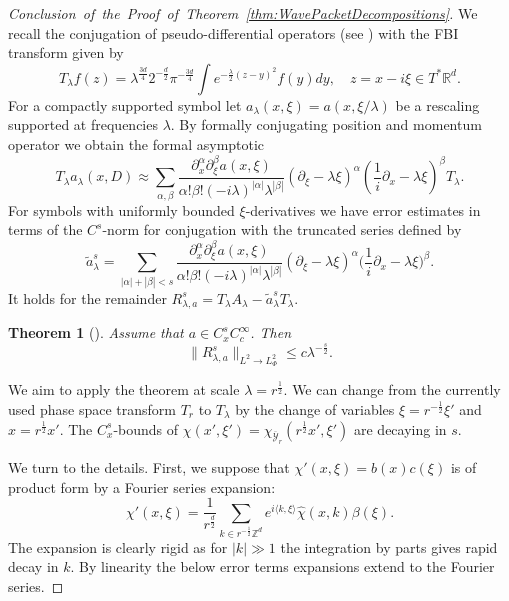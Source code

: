 \documentclass{amsart}
\newtheorem{theorem}{Theorem}[section]
\theoremstyle{definition}
\newcommand{\R}{\mathbb{R}}
\newcommand{\Z}{\mathbb{Z}}
\begin{document}
\begin{proof}[Conclusion~of~the~Proof~of~Theorem~\ref{thm:WavePacketDecompositions}]
\smallskip

    We recall the conjugation of pseudo-differential operators (see \cite[p.~351]{Tataru2000}) with the FBI transform given by
    \begin{equation*}
        T_\lambda f(z) = \lambda^{\frac{3d}{4}} 2^{-\frac{d}{2}} \pi^{-\frac{3d}{4}} \int e^{- \frac{\lambda}{2} (z-y)^2} f(y) dy, \quad z = x-i\xi \in T^* \R^d.
    \end{equation*}
    For a compactly supported symbol let $a_\lambda(x,\xi) = a(x,\xi/\lambda)$ be a rescaling supported at frequencies $\lambda$. By formally conjugating position and momentum operator we obtain the formal asymptotic
    \begin{equation*}
        T_\lambda a_\lambda(x,D) \approx \sum_{\alpha,\beta}  \frac{\partial_x^{\alpha} \partial_{\xi}^{\beta} a(x,\xi)}{\alpha! \beta! (-i \lambda)^{|\alpha|} \lambda^{|\beta|}} (\partial_{\xi} - \lambda \xi)^{\alpha} ( \frac{1}{i} \partial_x - \lambda \xi)^{\beta} T_\lambda.
    \end{equation*}
    For symbols with uniformly bounded $\xi$-derivatives we have error estimates in terms of the $C^s$-norm for conjugation with the truncated series defined by
    \begin{equation*}
        \tilde{a}^s_\lambda = \sum_{|\alpha|+|\beta|<s}  \frac{\partial_x^{\alpha} \partial_{\xi}^{\beta} a(x,\xi)}{\alpha! \beta! (-i \lambda)^{|\alpha|} \lambda^{|\beta|}} (\partial_{\xi} - \lambda \xi)^{\alpha} \big( \frac{1}{i} \partial_x - \lambda \xi \big)^{\beta}.
    \end{equation*}
    It holds for the remainder $R^s_{\lambda,a} = T_\lambda A_\lambda - \tilde{a}^s_\lambda T_\lambda$.
    \begin{theorem}[{\cite[Theorem~1]{Tataru2001}}]
    \label{thm:SymbolConjugation}
        Assume that $a \in C^s_x C^\infty_c$. Then
        \begin{equation*}
            \| R^s_{\lambda,a} \|_{L^2 \to L^2_{\Phi}} \leq c \lambda^{-\frac{s}{2}}.
        \end{equation*}
    \end{theorem}
    We aim to apply the theorem at scale $\lambda = r^{\frac{1}{2}}$. We can change from the currently used phase space transform $T_r$ to $T_\lambda$ by the change of variables $\xi = r^{-\frac{1}{2}} \xi'$ and $x = r^{\frac{1}{2}} x'$. The $C^s_x$-bounds of $\chi(x',\xi') = \chi_{\overline{\mathcal{Y}}_r}(r^{\frac{1}{2}} x',\xi')$ are decaying in $s$. 

    We turn to the details. First, we suppose that $\chi'(x,\xi) = b(x) c(\xi)$ is of product form by a Fourier series expansion:
    \begin{equation*}
        \chi'(x,\xi) = \frac{1}{r^{\frac{d}{2}}} \sum_{k \in r^{-\frac{1}{2}} \Z^d} e^{i \langle k , \xi \rangle} \hat{\chi}(x,k) \beta(\xi).
    \end{equation*}
    The expansion is clearly rigid as for $|k| \gg 1$ the integration by parts gives rapid decay in $k$. By linearity the below error terms expansions extend to the Fourier series.
    

\end{proof}
\end{document}
